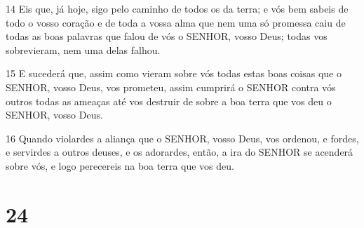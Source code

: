 \par 14 Eis que, já hoje, sigo pelo caminho de todos os da terra; e vós bem sabeis de todo o vosso coração e de toda a vossa alma que nem uma só promessa caiu de todas as boas palavras que falou de vós o SENHOR, vosso Deus; todas vos sobrevieram, nem uma delas falhou.
\par 15 E sucederá que, assim como vieram sobre vós todas estas boas coisas que o SENHOR, vosso Deus, vos prometeu, assim cumprirá o SENHOR contra vós outros todas as ameaças até vos destruir de sobre a boa terra que vos deu o SENHOR, vosso Deus.
\par 16 Quando violardes a aliança que o SENHOR, vosso Deus, vos ordenou, e fordes, e servirdes a outros deuses, e os adorardes, então, a ira do SENHOR se acenderá sobre vós, e logo perecereis na boa terra que vos deu.

\chapter{24}

